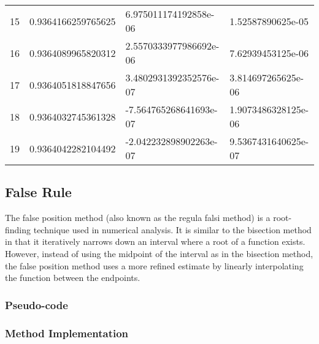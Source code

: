 \documentclass{article}
\begin{document}
\begin{table}[ht]
\begin{tabular}{llll}
        15 & 0.9364166259765625 & 6.975011174192858e-06   & 1.52587890625e-05   \\
        16 & 0.9364089965820312 & 2.5570333977986692e-06  & 7.62939453125e-06   \\
        17 & 0.9364051818847656 & 3.4802931392352576e-07  & 3.814697265625e-06  \\
        18 & 0.9364032745361328 & -7.564765268641693e-07  & 1.9073486328125e-06 \\
        19 & 0.9364042282104492 & -2.042232898902263e-07  & 9.5367431640625e-07
        \end{tabular}\label{tab:table2}
        \end{table}

    \subsection{False Rule}\label{subsec:false_rule}

        The false position method (also known as the regula falsi method) is a root-finding technique used in numerical analysis.
        It is similar to the bisection method in that it iteratively narrows down an interval where a root of a function exists.
        However, instead of using the midpoint of the interval as in the bisection method, the false position method uses a
        more refined estimate by linearly interpolating the function between the endpoints.

        \subsubsection{Pseudo-code}

        \subsubsection{Method Implementation}
\end{document}
